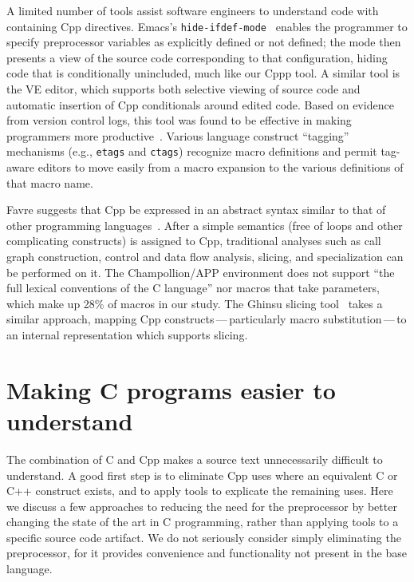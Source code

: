 \documentclass[10pt]{article}
\begin{document}
A limited number of tools assist software engineers to
understand code with containing Cpp directives.  Emacs's
\texttt{hide-ifdef-mode}~\cite{GNUEmacs19.26} enables the programmer to specify
preprocessor variables as explicitly defined or not defined; the mode then
presents a view of the source code corresponding to that configuration,
hiding code that is conditionally unincluded, much like our Cppp tool.
A similar tool is the VE editor, which supports both selective viewing of
source code and automatic insertion of Cpp conditionals around edited
code.  Based on evidence from version control logs, this tool was found to
be effective in making programmers more productive~\cite{AtkinsBGM99}. 
Various language construct ``tagging'' mechanisms (e.g., \texttt{etags} and
\texttt{ctags}) recognize macro definitions and permit tag-aware editors
to move easily from a macro expansion to the various definitions of that
macro name.

Favre suggests that Cpp be expressed in an abstract syntax similar to that of
other programming languages~\cite{Favre96}.  After a simple semantics (free
of loops and other complicating constructs) is assigned to Cpp, traditional
analyses such as call graph construction, control and data flow analysis,
slicing, and specialization can be performed on it.  The Champollion/APP
environment does not support ``the full lexical conventions of the C
language'' nor macros that take parameters, which make up 28\% of macros in
our study.
The Ghinsu slicing tool~\cite{LivadasS94} takes a similar approach, mapping
Cpp constructs\,---\,particularly macro substitution\,---\,to an internal
representation which supports slicing.




\section{Making C programs easier to understand}
\label{sec:easier-to-understand}

The combination of C and Cpp makes a source text unnecessarily difficult
to understand.  A good first step is to eliminate Cpp uses where an
equivalent C or C++ construct exists, and to apply tools to explicate
the remaining uses.  Here we discuss a few approaches to reducing the
need for the preprocessor by better changing the state of the art in C
programming, rather than applying tools to a specific source code
artifact.  We do not seriously consider simply eliminating the
preprocessor, for it provides convenience and functionality not present
in the base language.
\end{document}
